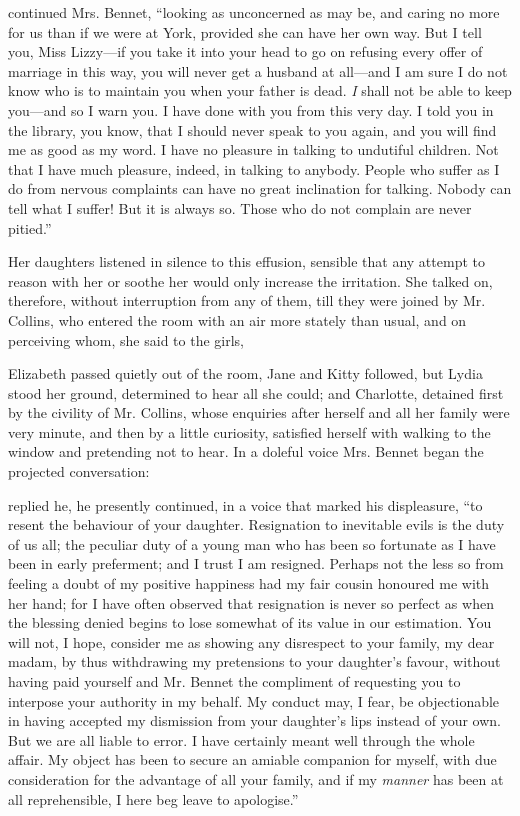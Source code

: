  continued Mrs. Bennet, “looking as unconcerned as may be, and caring no more for us than if we were at York, provided she can have her own way. But I tell you, Miss Lizzy---if you take it into your head to go on refusing every offer of marriage in this way, you will never get a husband at all---and I am sure I do not know who is to maintain you when your father is dead. {\em I} shall not be able to keep you---and so I warn you. I have done with you from this very day. I told you in the library, you know, that I should never speak to you again, and you will find me as good as my word. I have no pleasure in talking to undutiful children. Not that I have much pleasure, indeed, in talking to anybody. People who suffer as I do from nervous complaints can have no great inclination for talking. Nobody can tell what I suffer! But it is always so. Those who do not complain are never pitied.”

Her daughters listened in silence to this effusion, sensible that any attempt to reason with her or soothe her would only increase the irritation. She talked on, therefore, without interruption from any of them, till they were joined by Mr. Collins, who entered the room with an air more stately than usual, and on perceiving whom, she said to the girls, 

Elizabeth passed quietly out of the room, Jane and Kitty followed, but Lydia stood her ground, determined to hear all she could; and Charlotte, detained first by the civility of Mr. Collins, whose enquiries after herself and all her family were very minute, and then by a little curiosity, satisfied herself with walking to the window and pretending not to hear. In a doleful voice Mrs. Bennet began the projected conversation: 

 replied he,  he presently continued, in a voice that marked his displeasure, “to resent the behaviour of your daughter. Resignation to inevitable evils is the duty of us all; the peculiar duty of a young man who has been so fortunate as I have been in early preferment; and I trust I am resigned. Perhaps not the less so from feeling a doubt of my positive happiness had my fair cousin honoured me with her hand; for I have often observed that resignation is never so perfect as when the blessing denied begins to lose somewhat of its value in our estimation. You will not, I hope, consider me as showing any disrespect to your family, my dear madam, by thus withdrawing my pretensions to your daughter's favour, without having paid yourself and Mr. Bennet the compliment of requesting you to interpose your authority in my behalf. My conduct may, I fear, be objectionable in having accepted my dismission from your daughter's lips instead of your own. But we are all liable to error. I have certainly meant well through the whole affair. My object has been to secure an amiable companion for myself, with due consideration for the advantage of all your family, and if my {\em manner} has been at all reprehensible, I here beg leave to apologise.”

